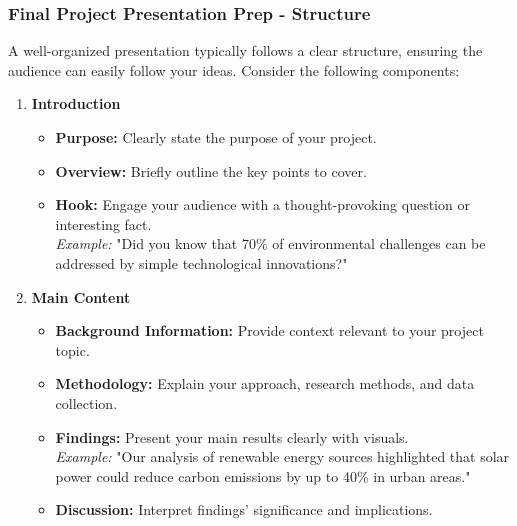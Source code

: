 \documentclass[aspectratio=169]{beamer}
\begin{document}
\begin{frame}[fragile]
    \frametitle{Final Project Presentation Prep - Structure}
    A well-organized presentation typically follows a clear structure, ensuring the audience can easily follow your ideas.
    Consider the following components:
    \begin{enumerate}
        \item \textbf{Introduction}
            \begin{itemize}
                \item \textbf{Purpose:} Clearly state the purpose of your project.
                \item \textbf{Overview:} Briefly outline the key points to cover.
                \item \textbf{Hook:} Engage your audience with a thought-provoking question or interesting fact.\\
                \textit{Example:} "Did you know that 70\% of environmental challenges can be addressed by simple technological innovations?"
            \end{itemize}

        \item \textbf{Main Content} 
            \begin{itemize}
                \item \textbf{Background Information:} Provide context relevant to your project topic.
                \item \textbf{Methodology:} Explain your approach, research methods, and data collection.
                \item \textbf{Findings:} Present your main results clearly with visuals.\\
                \textit{Example:} "Our analysis of renewable energy sources highlighted that solar power could reduce carbon emissions by up to 40\% in urban areas."
                \item \textbf{Discussion:} Interpret findings' significance and implications.
            \end{itemize}
    \end{enumerate}
\end{frame}
\end{document}
